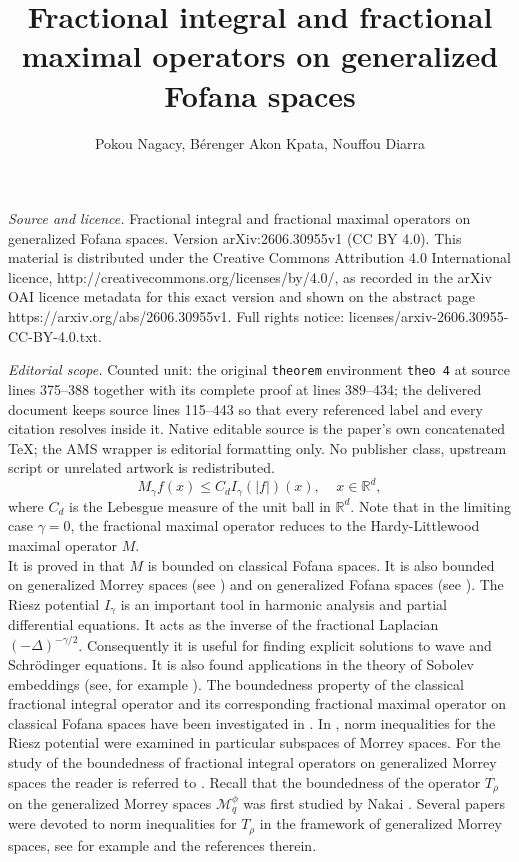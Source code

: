 \documentclass[10pt,a4paper]{amsart}
\numberwithin{equation}{section}
\numberwithin{equation}{section}
\begin{document}
\title[Fractional integral and fractional maximal operators on gene]{Fractional integral and fractional maximal operators on generalized Fofana spaces}
\author{Pokou Nagacy, Bérenger Akon Kpata, Nouffou Diarra}
\date{}
\maketitle
\noindent\emph{Source and licence.} Fractional integral and fractional maximal operators on generalized Fofana spaces. Version arXiv:2606.30955v1 (CC BY 4.0). This material is distributed under the Creative Commons Attribution 4.0 International licence, http://creativecommons.org/licenses/by/4.0/, as recorded in the arXiv OAI licence metadata for this exact version and shown on the abstract page https://arxiv.org/abs/2606.30955v1. Full rights notice: licenses/arxiv-2606.30955-CC-BY-4.0.txt.\par\smallskip
\noindent\textit{Editorial scope.} Counted unit: the original \texttt{theorem} environment \texttt{theo 4} at source lines 375--388 together with its complete proof at lines 389--434; the delivered document keeps source lines 115--443 so that every referenced label and every citation resolves inside it. Native editable source is the paper's own concatenated TeX; the AMS wrapper is editorial formatting only. No publisher class, upstream script or unrelated artwork is redistributed.
\begin{equation} \label{rel 11}
M_{\gamma} f(x) \leq C_{d}I_{\gamma} (\vert f \vert)(x),\;\;\;\; x\in \mathbb{R}^{d},
\end{equation}
where $C_{d}$ is the Lebesgue measure of the unit ball in $\mathbb{R}^{d}$.
Note that in the limiting case $\gamma=0$, the fractional maximal operator reduces to the Hardy-Littlewood maximal operator $ M$.\\
It is proved in \cite{JF} that $ M $ is bounded on classical Fofana spaces. It is also bounded on generalized Morrey spaces (see \cite{EN}) and on generalized Fofana spaces (see \cite{NKD}). The Riesz potential $I_{\gamma}$ is an important tool in harmonic analysis and partial differential equations. It acts as the inverse of the fractional Laplacian $(-\Delta)^{-\gamma/2}$. Consequently it is useful for finding explicit solutions to wave and Schr\"odinger equations. It is also found applications in the theory of Sobolev embeddings (see, for example \cite{Ma}). The boundedness property of the classical fractional integral operator and its corresponding fractional maximal operator on classical Fofana spaces have been investigated in \cite{JF, fof, Fof}. In \cite{Fof-F-K}, norm inequalities for the Riesz potential were examined in particular subspaces of Morrey spaces. For the study of the boundedness of fractional integral operators on generalized Morrey spaces the reader is referred to \cite{GE, EN, ST}. Recall that the boundedness of the operator $T_{\rho}$ on the generalized Morrey spaces $\mathcal{M}_{q}^{\phi}$ was first studied by Nakai \cite{EN1}. Several papers were devoted to norm inequalities for $T_{\rho}$ in the framework of generalized Morrey spaces, see for example \cite{GE, S-S-T, Su} and the references therein.
\end{document}
